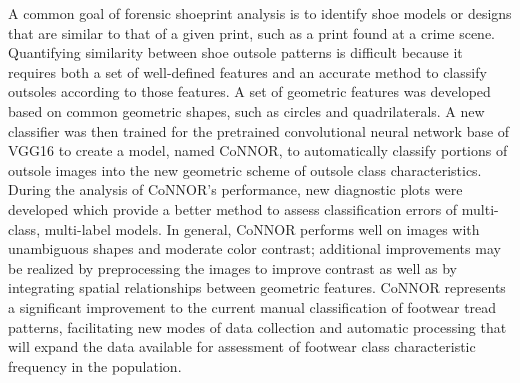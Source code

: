 
A common goal of forensic shoeprint analysis is to identify shoe models or designs that are similar to that of a given print, such as a print found at a crime scene. Quantifying similarity between shoe outsole patterns is difficult because it requires both a set of well-defined features and an accurate method to classify outsoles according to those features. A set of geometric features was developed based on common geometric shapes, such as circles and quadrilaterals. A new classifier was then trained for the pretrained convolutional neural network base of VGG16 to create a model, named CoNNOR, to automatically classify portions of outsole images into the new geometric scheme of outsole class characteristics. During the analysis of CoNNOR's performance, new diagnostic plots were developed which provide a better method to assess classification errors of multi-class, multi-label models. In general, CoNNOR performs well on images with unambiguous shapes and moderate color contrast; additional improvements may be realized by preprocessing the images to improve contrast as well as by integrating spatial relationships between geometric features. CoNNOR represents a significant improvement to the current manual classification of footwear tread patterns, facilitating new modes of data collection and automatic processing that will expand the data available for assessment of footwear class characteristic frequency in the population.
